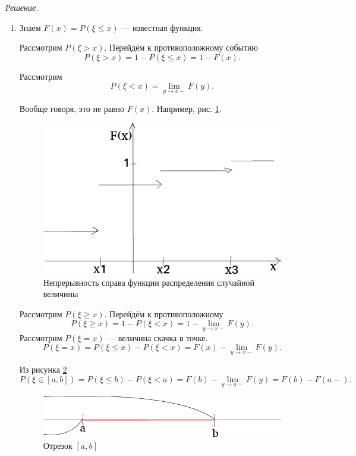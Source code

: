 \textit{Решение.}
\begin{enumerate}[label=\alph*)]
\item Знаем $F \left( x \right) = P \left( \xi \leq x \right) $ --- известная функция.

Рассмотрим $P \left( \xi > x \right) $.
Перейдём к противоположному событию
$$P \left( \xi > x \right) =
1 - P \left( \xi \leq x \right) =
1 - F \left( x \right).$$

Рассмотрим
$$P \left( \xi < x \right) =
\lim \limits_{y \to x -} F \left( y \right).$$

Вообще говоря, это не равно $F \left( x \right) $.
Например, рис. \ref{fig:93}.

\begin{figure}[h!]
  \centering
  \includegraphics[width=.4\textwidth]{./pictures/9_3.png}
  \caption{Непрерывность справа функции распределения случайной величины}
  \label{fig:93}
\end{figure}

Рассмотрим $P \left( \xi \geq x \right)$.
Перейдём к противоположному
$$P \left( \xi \geq x \right) =
1 - P \left( \xi < x \right) =
1 - \lim \limits_{y \to x-} F \left( y \right).$$
Рассмотрим $P \left( \xi = x \right) $ --- величина скачка в точке.
$$P \left( \xi = x \right) =
P \left( \xi \leq x \right) - P \left( \xi < x \right) =
F \left( x \right) - \lim \limits_{y \to x-} F \left( y \right).$$

Из рисунка \ref{fig:931}
$$P \left( \xi \in \left[ a, b \right] \right) =
P \left( \xi \leq b \right) - P \left( \xi < a \right) =
F \left( b \right) - \lim \limits_{y \to a-} F \left( y \right) =
F \left( b \right) - F \left( a- \right).$$

\begin{figure}[h!]
  \centering
  \includegraphics[width=.4\textwidth]{./pictures/9_3_1.png}
  \caption{Отрезок $ \left[ a, b \right] $}
  \label{fig:931}
\end{figure}


\end{enumerate}
